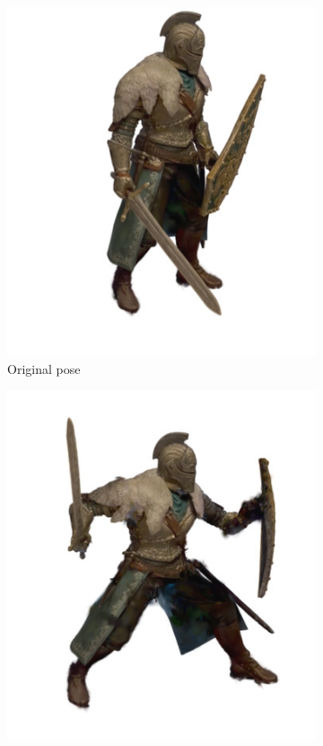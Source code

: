 \begin{figure}[tb]
  \centering
  \begin{subfigure}{0.31\linewidth}
 \includegraphics[width=\linewidth]{images/artifacts/static.jpg}
 \caption{\tiny Original pose}
  \end{subfigure}
  \hfill
  \begin{subfigure}{0.31\linewidth}
  \includegraphics[width=\linewidth]{images/artifacts/no_artifact.jpg}

\end{subfigure}
\end{figure}
